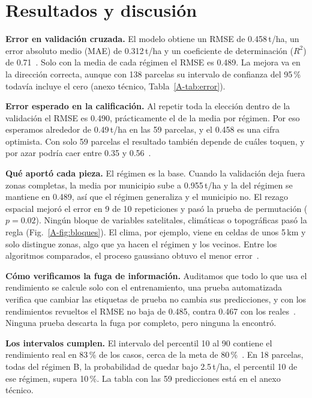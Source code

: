 \section{Resultados y discusión}\label{sec:resultados}

\textbf{Error en validación cruzada.} El modelo obtiene un RMSE de 0.458\,t/ha, un error absoluto medio (MAE) de
0.312\,t/ha y un coeficiente de determinación ($R^2$) de 0.71~\cite{doc_modelo}. Solo con la media de cada régimen el
RMSE es 0.489. La mejora va en la dirección correcta, aunque con 138 parcelas su intervalo de confianza del 95\,\%
todavía incluye el cero (anexo técnico, Tabla~\ref{A-tab:error}).

\textbf{Error esperado en la calificación.} Al repetir toda la elección dentro de la validación el RMSE es 0.490,
prácticamente el de la media por régimen. Por eso esperamos alrededor de 0.49\,t/ha en las 59 parcelas, y el 0.458 es
una cifra optimista. Con solo 59 parcelas el resultado también depende de cuáles toquen, y por azar podría caer entre
0.35 y 0.56~\cite{doc_modelo}.

\textbf{Qué aportó cada pieza.} El régimen es la base. Cuando la validación deja fuera zonas completas, la media por
municipio sube a 0.955\,t/ha y la del régimen se mantiene en 0.489, así que el régimen generaliza y el municipio no. El
rezago espacial mejoró el error en 9 de 10 repeticiones y pasó la prueba de permutación ($p=0.02$). Ningún bloque de
variables satelitales, climáticas o topográficas pasó la regla (Fig.~\ref{A-fig:bloques}). El clima, por ejemplo,
viene en celdas de unos 5\,km y solo distingue zonas, algo que ya hacen el régimen y los vecinos. Entre los algoritmos
comparados, el proceso gaussiano obtuvo el menor error~\cite{doc_modelo}.

\textbf{Cómo verificamos la fuga de información.} Auditamos que todo lo que usa el rendimiento se calcule solo con el
entrenamiento, una prueba automatizada verifica que cambiar las etiquetas de prueba no cambia sus predicciones, y con
los rendimientos revueltos el RMSE no baja de 0.485, contra 0.467 con los reales~\cite{doc_modelo}. Ninguna prueba
descarta la fuga por completo, pero ninguna la encontró.

\textbf{Los intervalos cumplen.} El intervalo del percentil 10 al 90 contiene el rendimiento real en 83\,\% de los
casos, cerca de la meta de 80\,\%~\cite{doc_modelo}. En 18 parcelas, todas del régimen B, la probabilidad de
quedar bajo 2.5\,t/ha, el percentil 10 de ese régimen, supera 10\,\%. La tabla con las 59 predicciones está en el
anexo técnico.

